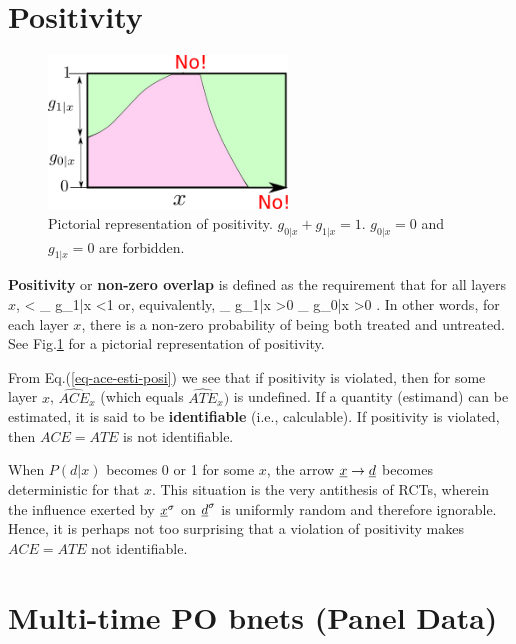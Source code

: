 \section{Positivity}

\begin{figure}[h!]
\centering
\includegraphics[width=2.5in]
{pot-out/po-positivity}
\caption{Pictorial
representation of positivity.
$g_{0|x}+g_{1|x}=1$.
$g_{0|x}=0$
and
$g_{1|x}=0$ are forbidden.} 
\label{fig-po-positivity}
\end{figure}



{\bf Positivity} 
or {\bf
non-zero overlap} is defined as the
requirement that for all layers $x$,
<
_{
g_{1|x}}
<1
\eeq
or, equivalently, 
\beq
{}_
{g_{1|x}}
>0
_
{g_{0|x}}
>0
\;.
\eeq
In other words, 
for each layer $x$,
there is
a non-zero
probability of being both treated 
and untreated.
See Fig.\ref{fig-po-positivity} for a pictorial 
representation of positivity.

From Eq.(\ref{eq-ace-esti-posi})
 we see that
if positivity is violated,
then 
for some 
layer $x$, 
 $\widehat{ACE}_x$
(which equals $\widehat{ATE}_x)$
is undefined. 
If a quantity (estimand)
 can be estimated,
it is said to be {\bf identifiable}
 (i.e.,
calculable). If positivity is violated,
 then
 $ACE=ATE$ is not identifiable.

 

When 
$P(d|x)$ 
becomes 0 or 1 for some $x$,
the arrow
${\underline{x}}\rightarrow{\underline{d}}$
becomes deterministic
for that $x$.
This situation
is
the very 
antithesis
of RCTs,
wherein 
the influence
exerted by ${\underline{x}}^\sigma$ on 
${\underline{d}}^\sigma$ is uniformly
random and therefore ignorable.
Hence, it is perhaps 
not too surprising
that a violation
of positivity makes
$ACE=ATE$
not identifiable.



\section{Multi-time PO bnets (Panel Data)}

